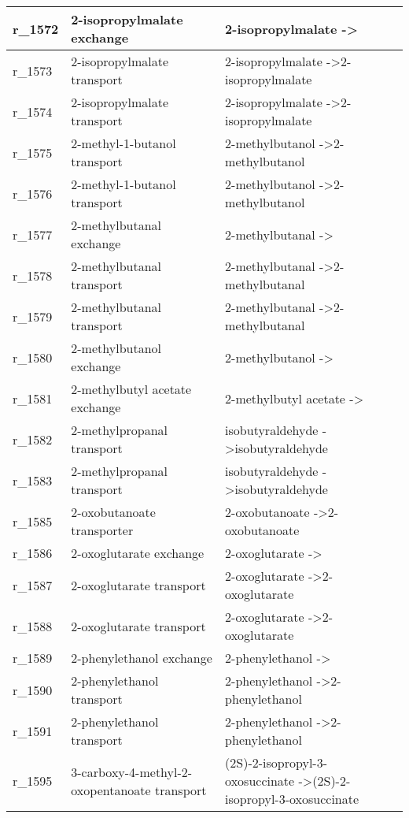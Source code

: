 \begin{landscape}
{\begin{longtable}{|l|p{7cm}|p{15cm}|}
r\_1572 & 2-isopropylmalate exchange & 2-isopropylmalate  -\textgreater{} \\ \hline
r\_1573 & 2-isopropylmalate transport & 2-isopropylmalate  -\textgreater 2-isopropylmalate \\ \hline
r\_1574 & 2-isopropylmalate transport & 2-isopropylmalate  -\textgreater 2-isopropylmalate \\ \hline
r\_1575 & 2-methyl-1-butanol transport & 2-methylbutanol  -\textgreater 2-methylbutanol \\ \hline
r\_1576 & 2-methyl-1-butanol transport & 2-methylbutanol  -\textgreater 2-methylbutanol \\ \hline
r\_1577 & 2-methylbutanal exchange & 2-methylbutanal  -\textgreater{} \\ \hline
r\_1578 & 2-methylbutanal transport & 2-methylbutanal  -\textgreater 2-methylbutanal \\ \hline
r\_1579 & 2-methylbutanal transport & 2-methylbutanal  -\textgreater 2-methylbutanal \\ \hline
r\_1580 & 2-methylbutanol exchange & 2-methylbutanol  -\textgreater{} \\ \hline
r\_1581 & 2-methylbutyl acetate exchange & 2-methylbutyl acetate  -\textgreater{} \\ \hline
r\_1582 & 2-methylpropanal transport & isobutyraldehyde  -\textgreater isobutyraldehyde \\ \hline
r\_1583 & 2-methylpropanal transport & isobutyraldehyde  -\textgreater isobutyraldehyde \\ \hline
r\_1585 & 2-oxobutanoate transporter & 2-oxobutanoate  -\textgreater 2-oxobutanoate \\ \hline
r\_1586 & 2-oxoglutarate exchange & 2-oxoglutarate  -\textgreater{} \\ \hline
r\_1587 & 2-oxoglutarate transport & 2-oxoglutarate  -\textgreater 2-oxoglutarate \\ \hline
r\_1588 & 2-oxoglutarate transport & 2-oxoglutarate  -\textgreater 2-oxoglutarate \\ \hline
r\_1589 & 2-phenylethanol exchange & 2-phenylethanol  -\textgreater{} \\ \hline
r\_1590 & 2-phenylethanol transport & 2-phenylethanol  -\textgreater 2-phenylethanol \\ \hline
r\_1591 & 2-phenylethanol transport & 2-phenylethanol  -\textgreater 2-phenylethanol \\ \hline
r\_1595 & 3-carboxy-4-methyl-2-oxopentanoate transport & (2S)-2-isopropyl-3-oxosuccinate  -\textgreater (2S)-2-isopropyl-3-oxosuccinate \\ \hline

\end{longtable}}
\end{landscape}
